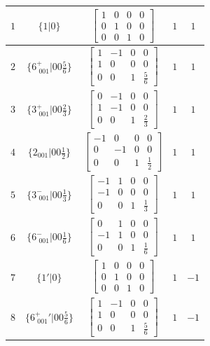 \documentclass[fleqn,8pt]{jsarticle}
\begin{document}
\begin{longtable}{ccccc}
$ 1 $ & $ \{1|0\} $ & $ \begin{bmatrix} 1 & 0 & 0 & 0 \\ 0 & 1 & 0 & 0 \\ 0 & 0 & 1 & 0 \end{bmatrix} $ & $ 1 $ & $ 1 $ \\ \hline
$ 2 $ & $ \{6^{+}_{\,\,001}|0 0 \frac{5}{6}\} $ & $ \begin{bmatrix} 1 & -1 & 0 & 0 \\ 1 & 0 & 0 & 0 \\ 0 & 0 & 1 & \frac{5}{6} \end{bmatrix} $ & $ 1 $ & $ 1 $ \\ \hline
$ 3 $ & $ \{3^{+}_{\,\,001}|0 0 \frac{2}{3}\} $ & $ \begin{bmatrix} 0 & -1 & 0 & 0 \\ 1 & -1 & 0 & 0 \\ 0 & 0 & 1 & \frac{2}{3} \end{bmatrix} $ & $ 1 $ & $ 1 $ \\ \hline
$ 4 $ & $ \{2{}_{001}|0 0 \frac{1}{2}\} $ & $ \begin{bmatrix} -1 & 0 & 0 & 0 \\ 0 & -1 & 0 & 0 \\ 0 & 0 & 1 & \frac{1}{2} \end{bmatrix} $ & $ 1 $ & $ 1 $ \\ \hline
$ 5 $ & $ \{3^{-}_{\,\,001}|0 0 \frac{1}{3}\} $ & $ \begin{bmatrix} -1 & 1 & 0 & 0 \\ -1 & 0 & 0 & 0 \\ 0 & 0 & 1 & \frac{1}{3} \end{bmatrix} $ & $ 1 $ & $ 1 $ \\ \hline
$ 6 $ & $ \{6^{-}_{\,\,001}|0 0 \frac{1}{6}\} $ & $ \begin{bmatrix} 0 & 1 & 0 & 0 \\ -1 & 1 & 0 & 0 \\ 0 & 0 & 1 & \frac{1}{6} \end{bmatrix} $ & $ 1 $ & $ 1 $ \\ \hline
$ 7 $ & $ \{1{}'|0\} $ & $ \begin{bmatrix} 1 & 0 & 0 & 0 \\ 0 & 1 & 0 & 0 \\ 0 & 0 & 1 & 0 \end{bmatrix} $ & $ 1 $ & $ -1 $ \\ \hline
$ 8 $ & $ \{6^{+}_{\,\,001}{}'|0 0 \frac{5}{6}\} $ & $ \begin{bmatrix} 1 & -1 & 0 & 0 \\ 1 & 0 & 0 & 0 \\ 0 & 0 & 1 & \frac{5}{6} \end{bmatrix} $ & $ 1 $ & $ -1 $ \\ \hline

\end{longtable}
\end{document}
